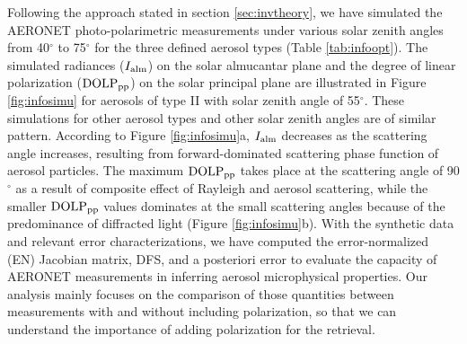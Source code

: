 Following the approach stated in section \ref{sec:invtheory}, 
we have simulated the AERONET photo-polarimetric measurements under various 
solar zenith angles from 40$^\circ$ to 75$^\circ$ for the three 
defined aerosol types (Table \ref{tab:infoopt}). The simulated radiances 
($I_\text{alm}$) on the solar almucantar plane and the degree of linear 
polarization ($\text{DOLP}_\text{pp}$) on the solar principal plane are illustrated in 
Figure \ref{fig:infosimu} for aerosols of type II with solar zenith angle of 
55$^\circ$. These simulations for other aerosol types and other
solar zenith angles are of similar pattern. According to Figure
\ref{fig:infosimu}a, $I_\text{alm}$ decreases as the scattering angle increases, 
resulting from forward-dominated scattering phase function of aerosol 
particles. The maximum $\text{DOLP}_\text{pp}$ takes place at the scattering angle of 
90$^\circ$ as a result of composite effect of Rayleigh and aerosol scattering, 
while the smaller $\text{DOLP}_\text{pp}$ values dominates at the small scattering angles 
because of the predominance of diffracted light (Figure \ref{fig:infosimu}b).
With the synthetic data and relevant error characterizations, we have computed
the error-normalized (EN) Jacobian matrix, DFS, and a posteriori error to evaluate the capacity of
AERONET measurements in inferring aerosol microphysical properties. Our
analysis mainly focuses on the comparison of those quantities between
measurements with and without including polarization, so that we can understand
the importance of adding polarization for the retrieval.  


